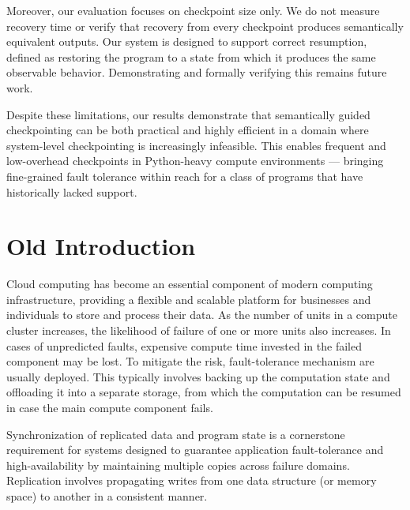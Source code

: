 Moreover, our evaluation focuses on checkpoint size only. We do not measure recovery time or verify that recovery from every checkpoint produces semantically equivalent outputs. Our system is designed to support correct resumption, defined as restoring the program to a state from which it produces the same observable behavior. Demonstrating and formally verifying this remains future work.

Despite these limitations, our results demonstrate that semantically guided checkpointing can be both practical and highly efficient in a domain where system-level checkpointing is increasingly infeasible. This enables frequent and low-overhead checkpoints in Python-heavy compute environments --- bringing fine-grained fault tolerance within reach for a class of programs that have historically lacked support.

\section{Old Introduction}

Cloud computing has become an essential component of modern computing infrastructure, providing a flexible and scalable platform for businesses and individuals to store and process their data.
As the number of units in a compute cluster increases, the likelihood of failure of one or more units also increases. 
In cases of unpredicted faults, expensive compute time invested in the failed component may be lost.
To mitigate the risk, fault-tolerance mechanism are usually deployed.
This typically involves backing up the computation state and offloading it into a separate storage, from which the computation can be resumed in case the main compute component fails.


Synchronization of replicated data and program state is a cornerstone
requirement for systems designed to guarantee application
fault-tolerance 
and high-availability 
by maintaining multiple copies across failure
domains. Replication involves propagating writes from one data
structure (or memory space) to another in a consistent manner.




